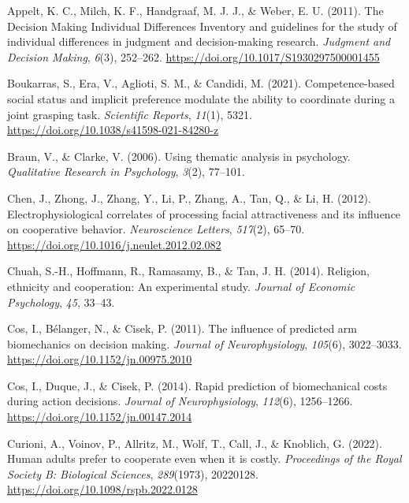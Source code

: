 \documentclass[
  man,
  floatsintext,
  longtable,
  nolmodern,
  notxfonts,
  notimes,
  colorlinks=true,linkcolor=blue,citecolor=blue,urlcolor=blue]{apa7}
\newlength{\cslhangindent}
\newenvironment{CSLReferences}[2] %
 {\begin{list}{}{%
  \setlength{\itemindent}{0pt}
  \setlength{\leftmargin}{0pt}
  \setlength{\parsep}{0pt}
  \ifodd #1
   \setlength{\leftmargin}{\cslhangindent}
   \setlength{\itemindent}{-1\cslhangindent}
  \fi
  \setlength{\itemsep}{#2\baselineskip}}}
 {\end{list}}
\begin{document}
\label{refs}
\begin{CSLReferences}{1}{0}
Appelt, K. C., Milch, K. F., Handgraaf, M. J. J., \& Weber, E. U.
(2011). The {Decision Making Individual Differences Inventory} and
guidelines for the study of individual differences in judgment and
decision-making research. \emph{Judgment and Decision Making},
\emph{6}(3), 252--262. \url{https://doi.org/10.1017/S1930297500001455}

Boukarras, S., Era, V., Aglioti, S. M., \& Candidi, M. (2021).
Competence-based social status and implicit preference modulate the
ability to coordinate during a joint grasping task. \emph{Scientific
Reports}, \emph{11}(1), 5321.
\url{https://doi.org/10.1038/s41598-021-84280-z}

Braun, V., \& Clarke, V. (2006). Using thematic analysis in psychology.
\emph{Qualitative Research in Psychology}, \emph{3}(2), 77--101.

Chen, J., Zhong, J., Zhang, Y., Li, P., Zhang, A., Tan, Q., \& Li, H.
(2012). Electrophysiological correlates of processing facial
attractiveness and its influence on cooperative behavior.
\emph{Neuroscience Letters}, \emph{517}(2), 65--70.
\url{https://doi.org/10.1016/j.neulet.2012.02.082}

Chuah, S.-H., Hoffmann, R., Ramasamy, B., \& Tan, J. H. (2014).
Religion, ethnicity and cooperation: {An} experimental study.
\emph{Journal of Economic Psychology}, \emph{45}, 33--43.

Cos, I., Bélanger, N., \& Cisek, P. (2011). The influence of predicted
arm biomechanics on decision making. \emph{Journal of Neurophysiology},
\emph{105}(6), 3022--3033. \url{https://doi.org/10.1152/jn.00975.2010}

Cos, I., Duque, J., \& Cisek, P. (2014). Rapid prediction of
biomechanical costs during action decisions. \emph{Journal of
Neurophysiology}, \emph{112}(6), 1256--1266.
\url{https://doi.org/10.1152/jn.00147.2014}

Curioni, A., Voinov, P., Allritz, M., Wolf, T., Call, J., \& Knoblich,
G. (2022). Human adults prefer to cooperate even when it is costly.
\emph{Proceedings of the Royal Society B: Biological Sciences},
\emph{289}(1973), 20220128. \url{https://doi.org/10.1098/rspb.2022.0128}


\end{CSLReferences}
\end{document}
